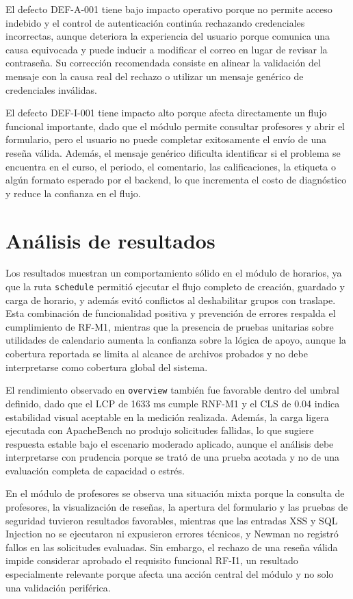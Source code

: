 \documentclass[11pt,spanish]{article}
\begin{document}
El defecto DEF-A-001 tiene bajo impacto operativo porque no permite acceso indebido y el control de autenticación continúa rechazando credenciales incorrectas, aunque deteriora la experiencia del usuario porque comunica una causa equivocada y puede inducir a modificar el correo en lugar de revisar la contraseña. Su corrección recomendada consiste en alinear la validación del mensaje con la causa real del rechazo o utilizar un mensaje genérico de credenciales inválidas.

El defecto DEF-I-001 tiene impacto alto porque afecta directamente un flujo funcional importante, dado que el módulo permite consultar profesores y abrir el formulario, pero el usuario no puede completar exitosamente el envío de una reseña válida. Además, el mensaje genérico dificulta identificar si el problema se encuentra en el curso, el periodo, el comentario, las calificaciones, la etiqueta o algún formato esperado por el backend, lo que incrementa el costo de diagnóstico y reduce la confianza en el flujo.

\section{Análisis de resultados}

Los resultados muestran un comportamiento sólido en el módulo de horarios, ya que la ruta \texttt{schedule} permitió ejecutar el flujo completo de creación, guardado y carga de horario, y además evitó conflictos al deshabilitar grupos con traslape. Esta combinación de funcionalidad positiva y prevención de errores respalda el cumplimiento de RF-M1, mientras que la presencia de pruebas unitarias sobre utilidades de calendario aumenta la confianza sobre la lógica de apoyo, aunque la cobertura reportada se limita al alcance de archivos probados y no debe interpretarse como cobertura global del sistema.

El rendimiento observado en \texttt{overview} también fue favorable dentro del umbral definido, dado que el LCP de 1633 ms cumple RNF-M1 y el CLS de 0.04 indica estabilidad visual aceptable en la medición realizada. Además, la carga ligera ejecutada con ApacheBench no produjo solicitudes fallidas, lo que sugiere respuesta estable bajo el escenario moderado aplicado, aunque el análisis debe interpretarse con prudencia porque se trató de una prueba acotada y no de una evaluación completa de capacidad o estrés.

En el módulo de profesores se observa una situación mixta porque la consulta de profesores, la visualización de reseñas, la apertura del formulario y las pruebas de seguridad tuvieron resultados favorables, mientras que las entradas XSS y SQL Injection no se ejecutaron ni expusieron errores técnicos, y Newman no registró fallos en las solicitudes evaluadas. Sin embargo, el rechazo de una reseña válida impide considerar aprobado el requisito funcional RF-I1, un resultado especialmente relevante porque afecta una acción central del módulo y no solo una validación periférica.
\end{document}
